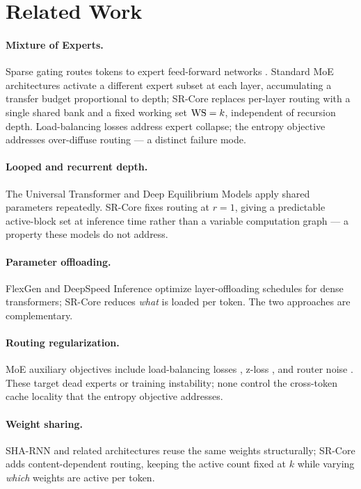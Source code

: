 \section{Related Work}
\label{sec:related}

\paragraph{Mixture of Experts.}
Sparse gating routes tokens to expert feed-forward networks
\citep{shazeer2017moe,fedus2022switch}.
Standard MoE architectures activate a different expert subset at each layer, accumulating
a transfer budget proportional to depth; SR-Core replaces per-layer routing with a single
shared bank and a fixed working set $\mathrm{WS} = k$, independent of recursion depth.
Load-balancing losses \citep{lepikhin2021gshard,fedus2022switch} address expert collapse;
the entropy objective addresses over-diffuse routing --- a distinct failure mode.

\paragraph{Looped and recurrent depth.}
The Universal Transformer \citep{dehghani2019universal} and Deep Equilibrium Models
\citep{bai2019deq} apply shared parameters repeatedly.
SR-Core fixes routing at $r = 1$, giving a predictable active-block set at inference time
rather than a variable computation graph --- a property these models do not address.

\paragraph{Parameter offloading.}
FlexGen \citep{sheng2023flexgen} and DeepSpeed Inference \citep{aminabadi2022deepspeed}
optimize layer-offloading schedules for dense transformers; SR-Core reduces \emph{what}
is loaded per token.
The two approaches are complementary.

\paragraph{Routing regularization.}
MoE auxiliary objectives include load-balancing losses \citep{fedus2022switch}, z-loss
\citep{zoph2022stmoe}, and router noise \citep{shazeer2017moe}.
These target dead experts or training instability; none control the cross-token cache
locality that the entropy objective addresses.

\paragraph{Weight sharing.}
SHA-RNN \citep{merity2019sharnn} and related architectures reuse the same weights
structurally; SR-Core adds content-dependent routing, keeping the active count fixed at
$k$ while varying \emph{which} weights are active per token.
